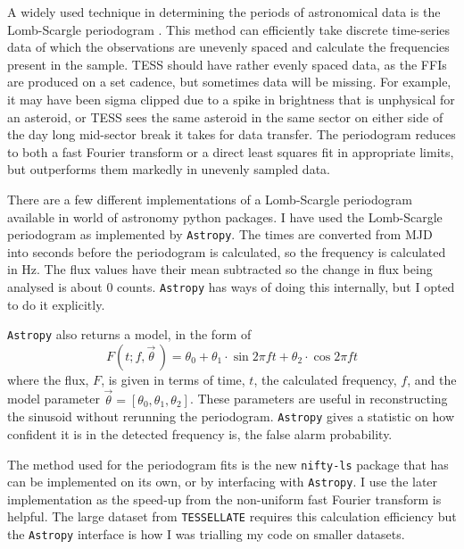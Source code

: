 \documentclass{UCreport}
\begin{document}
A widely used technique in determining the periods of astronomical data is the Lomb-Scargle periodogram \citep[\citet{Lomb1976,Scargle1982}, but see][for a review]{VanderPlas2018}.
This method can efficiently take discrete time-series data of which the observations are unevenly spaced and calculate the frequencies present in the sample.
TESS should have rather evenly spaced data, as the FFIs are produced on a set cadence, but sometimes data will be missing.
For example, it may have been sigma clipped due to a spike in brightness that is unphysical for an asteroid, or TESS sees the same asteroid in the same sector on either side of the day long mid-sector break it takes for data transfer.
The periodogram reduces to both a fast Fourier transform or a direct least squares fit in appropriate limits, but outperforms them markedly in unevenly sampled data.

There are a few different implementations of a Lomb-Scargle periodogram available in world of astronomy python packages.
I have used the Lomb-Scargle periodogram as implemented by \texttt{Astropy}\citep[\citet{Astropy2022} but see][for the implementation]{Vanderplas2012,Vanderplas2015}.
The times are converted from MJD into seconds before the periodogram is calculated, so the frequency is calculated in \unit{\hertz}.
The flux values have their mean subtracted so the change in flux being analysed is about 0 counts.
\texttt{Astropy} has ways of doing this internally, but I opted to do it explicitly.

\texttt{Astropy} also returns a model, in the form of
\begin{equation}
  \label{Eq:LCModel}
  F(t;f,\vec{\theta}\,) = \theta_0 + \theta_1\cdot\sin{2\pi ft} +\theta_2\cdot\cos{2\pi ft}
\end{equation}
where the flux, $F$, is given in terms of time, $t$, the calculated frequency, $f$, and the model parameter $\vec{\theta} = [\theta_0, \theta_1,\theta_2]$.
These parameters are useful in reconstructing the sinusoid without rerunning the periodogram.
\texttt{Astropy} gives a statistic on how confident it is in the detected frequency is, the false alarm probability.

The method used for the periodogram fits is the new \texttt{nifty-ls} package \citep{Garrison2024} that has can be implemented on its own, or by interfacing with \texttt{Astropy}.
I use the later implementation as the speed-up from the non-uniform fast Fourier transform is helpful.
The large dataset from \texttt{TESSELLATE} requires this calculation efficiency but the \texttt{Astropy} interface is how I was trialling my code on smaller datasets.
\end{document}
